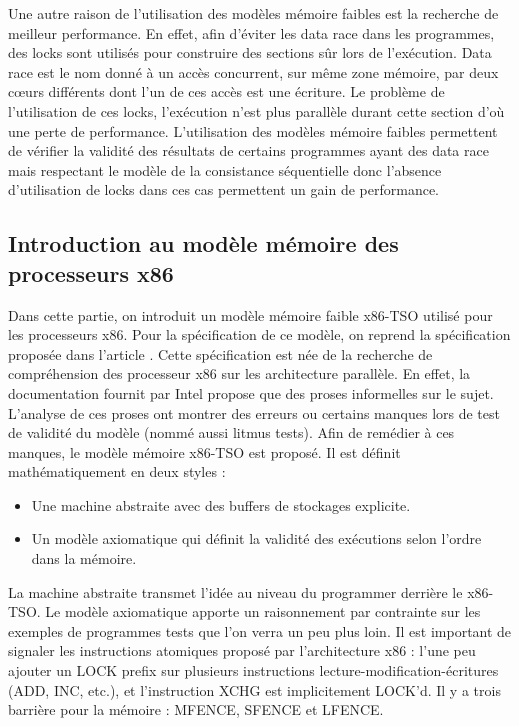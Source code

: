 \documentclass[12pt,a4paper]{article}
\begin{document}
Une autre raison de l'utilisation des modèles mémoire faibles est la recherche de meilleur performance. En effet, afin d'éviter les data race dans les programmes, des locks sont utilisés pour construire des sections sûr lors de l'exécution. Data race est le nom donné à un accès concurrent, sur même zone mémoire, par deux cœurs différents dont l'un de ces accès est une écriture. Le problème de l'utilisation de ces locks, l'exécution n'est plus parallèle durant cette section d'où une perte de performance. L'utilisation des modèles mémoire faibles permettent de vérifier la validité des résultats de certains programmes ayant des data race mais respectant le modèle de la consistance séquentielle donc l'absence d'utilisation de locks dans ces cas permettent un gain de performance.  

\subsection{Introduction au modèle mémoire des processeurs x86}
 
Dans cette partie, on introduit un modèle mémoire faible x86-TSO utilisé pour les processeurs x86. Pour la spécification de ce modèle, on reprend la spécification proposée dans l'article \cite{Sewell:2010:XRU:1785414.1785443}. Cette spécification est née de la recherche de compréhension des processeur x86 sur les architecture parallèle. En effet, la documentation fournit par Intel propose que des proses informelles sur le sujet. L'analyse de ces proses ont montrer des erreurs ou certains manques lors de test de validité du modèle (nommé aussi litmus tests). Afin de remédier à ces manques, le modèle mémoire x86-TSO est proposé. Il est définit mathématiquement en deux styles :
\begin{itemize}
	\item Une machine abstraite avec des buffers de stockages explicite.
	\item Un modèle axiomatique qui définit la validité des exécutions selon l'ordre dans la mémoire. 
\end{itemize}
La machine abstraite transmet l'idée au niveau du programmer derrière le x86-TSO. Le modèle axiomatique apporte un raisonnement par contrainte sur les exemples de programmes tests que l'on verra un peu plus loin. Il est important de signaler les instructions atomiques proposé par l'architecture x86 : l'une peu ajouter un LOCK prefix sur plusieurs instructions lecture-modification-écritures (ADD, INC, etc.), et l'instruction XCHG est implicitement LOCK'd. Il y a trois barrière pour la mémoire : MFENCE, SFENCE et LFENCE.
\end{document}
